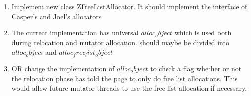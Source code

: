 \begin{enumerate}
    \item Implement new class ZFreeListAllocator. It should implement the interface of Casper's and Joel's allocators
    
    \item The current implementation has universal $alloc_object$ which is used both during relocation and mutator allocation. should maybe be divided into $alloc_object$ and $alloc_free_list_object$
    
    \item OR change the implementation of $alloc_object$ to check a flag whether or not the relocation phase has told the page to only do free list allocations. This would allow future mutator threads to use the free list allocation if necessary. 
\end{enumerate}

